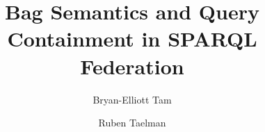 \documentclass[sigconf, review]{acmart}
\title{Bag Semantics and Query Containment in SPARQL Federation}
\author{Bryan-Elliott Tam}
\affiliation{%
  \institution{Ghent University}
  \city{Ghent}
  \country{Belgium}
}
\author{Ruben Taelman}
\affiliation{%
  \institution{Ghent University}
  \city{Ghent}
  \country{Belgium}
}
\begin{document}


\maketitle

\acresetall











\balance


\end{document}
